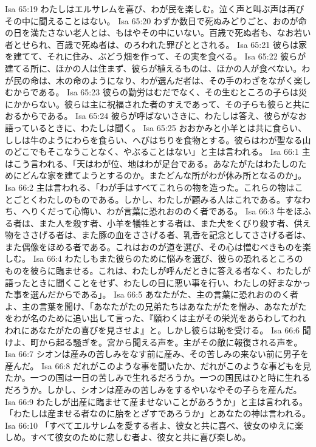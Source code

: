 Isa 65:19  わたしはエルサレムを喜び、わが民を楽しむ。泣く声と叫ぶ声は再びその中に聞えることはない。
Isa 65:20  わずか数日で死ぬみどりごと、おのが命の日を満たさない老人とは、もはやその中にいない。百歳で死ぬ者も、なお若い者とせられ、百歳で死ぬ者は、のろわれた罪びととされる。
Isa 65:21  彼らは家を建てて、それに住み、ぶどう畑を作って、その実を食べる。
Isa 65:22  彼らが建てる所に、ほかの人は住まず、彼らが植えるものは、ほかの人が食べない。わが民の命は、木の命のようになり、わが選んだ者は、その手のわざをながく楽しむからである。
Isa 65:23  彼らの勤労はむだでなく、その生むところの子らは災にかからない。彼らは主に祝福された者のすえであって、その子らも彼らと共におるからである。
Isa 65:24  彼らが呼ばないさきに、わたしは答え、彼らがなお語っているときに、わたしは聞く。
Isa 65:25  おおかみと小羊とは共に食らい、ししは牛のようにわらを食らい、へびはちりを食物とする。彼らはわが聖なる山のどこでもそこなうことなく、やぶることはない」と主は言われる。
Isa 66:1  主はこう言われる、「天はわが位、地はわが足台である。あなたがたはわたしのためにどんな家を建てようとするのか。またどんな所がわが休み所となるのか」。
Isa 66:2  主は言われる、「わが手はすべてこれらの物を造った。これらの物はことごとくわたしのものである。しかし、わたしが顧みる人はこれである。すなわち、へりくだって心悔い、わが言葉に恐れおののく者である。
Isa 66:3  牛をほふる者は、また人を殺す者、小羊を犠牲とする者は、また犬をくびり殺す者、供え物をささげる者は、また豚の血をささげる者、乳香を記念としてささげる者は、また偶像をほめる者である。これはおのが道を選び、その心は憎むべきものを楽しむ。
Isa 66:4  わたしもまた彼らのために悩みを選び、彼らの恐れるところのものを彼らに臨ませる。これは、わたしが呼んだときに答える者なく、わたしが語ったときに聞くことをせず、わたしの目に悪い事を行い、わたしの好まなかった事を選んだからである」。
Isa 66:5  あなたがた、主の言葉に恐れおののく者よ、主の言葉を聞け、「あなたがたの兄弟たちはあなたがたを憎み、あなたがたをわが名のために追い出して言った、『願わくは主がその栄光をあらわしてわれわれにあなたがたの喜びを見させよ』と。しかし彼らは恥を受ける。
Isa 66:6  聞けよ、町から起る騒ぎを。宮から聞える声を。主がその敵に報復される声を。
Isa 66:7  シオンは産みの苦しみをなす前に産み、その苦しみの来ない前に男子を産んだ。
Isa 66:8  だれがこのような事を聞いたか、だれがこのような事どもを見たか。一つの国は一日の苦しみで生れるだろうか。一つの国民はひと時に生れるだろうか。しかし、シオンは産みの苦しみをするやいなやその子らを産んだ。
Isa 66:9  わたしが出産に臨ませて産ませないことがあろうか」と主は言われる。「わたしは産ませる者なのに胎をとざすであろうか」とあなたの神は言われる。
Isa 66:10  「すべてエルサレムを愛する者よ、彼女と共に喜べ、彼女のゆえに楽しめ。すべて彼女のために悲しむ者よ、彼女と共に喜び楽しめ。
